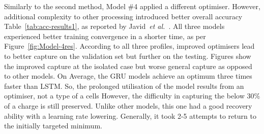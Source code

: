 %
%
Similarly to the second method, Model \#4 applied a different optimiser.
However, additional complexity to other processing introduced better overall accuracy Table~\ref{tab:acc-results1}, as reported by Javid~\textit{et al.}~\cite{javid_adaptive_2020}.
All three models experienced better training convergence in a shorter time, as per Figure~\ref{fig:Model-4res}.
According to all three profiles, improved optimisers lead to better capture on the validation set but further on the testing.
Figures show the improved capture at the isolated case but worse general capture as opposed to other models.
On Average, the GRU models achieve an optimum three times faster than LSTM.
So, the prolonged utilisation of the model results from an optimiser, not a type of a cells
However, the difficulty in capturing the below 30\% of a charge is still preserved.
Unlike other models, this one had a good recovery ability with a learning rate lowering.
Generally, it took 2-5 attempts to return to the initially targeted minimum.

